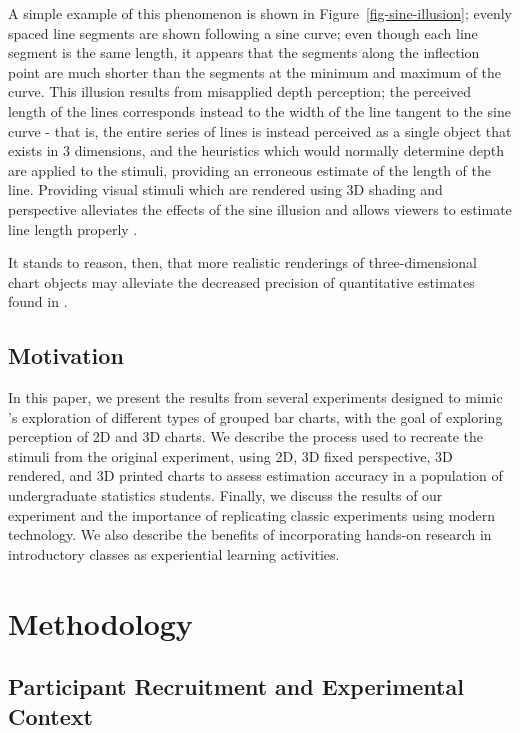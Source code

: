 \documentclass[runningheads
]{llncs}
\begin{document}
A simple example of this phenomenon is shown in
Figure~\ref{fig-sine-illusion}; evenly spaced line segments are shown
following a sine curve; even though each line segment is the same
length, it appears that the segments along the inflection point are much
shorter than the segments at the minimum and maximum of the curve. This
illusion results from misapplied depth perception; the perceived length
of the lines corresponds instead to the width of the line tangent to the
sine curve - that is, the entire series of lines is instead perceived as
a single object that exists in 3 dimensions, and the heuristics which
would normally determine depth are applied to the stimuli, providing an
erroneous estimate of the length of the line. Providing visual stimuli
which are rendered using 3D shading and perspective alleviates the
effects of the sine illusion and allows viewers to estimate line length
properly \autocite[Fig 3]{vanderplasSignsSineIllusion2015}.

It stands to reason, then, that more realistic renderings of
three-dimensional chart objects may alleviate the decreased precision of
quantitative estimates found in
\textcite{clevelandGraphicalPerceptionTheory1984}.

\hypertarget{motivation}{%
\subsection{Motivation}\label{motivation}}

In this paper, we present the results from several experiments designed
to mimic \textcite{clevelandGraphicalPerceptionTheory1984}'s exploration
of different types of grouped bar charts, with the goal of exploring
perception of 2D and 3D charts. We describe the process used to recreate
the stimuli from the original experiment, using 2D, 3D fixed
perspective, 3D rendered, and 3D printed charts to assess estimation
accuracy in a population of undergraduate statistics students. Finally,
we discuss the results of our experiment and the importance of
replicating classic experiments using modern technology. We also
describe the benefits of incorporating hands-on research in introductory
classes as experiential learning activities.

\hypertarget{methodology}{%
\section{Methodology}\label{methodology}}

\hypertarget{participant-recruitment-and-experimental-context}{%
\subsection{Participant Recruitment and Experimental
Context}\label{participant-recruitment-and-experimental-context}}
\end{document}
